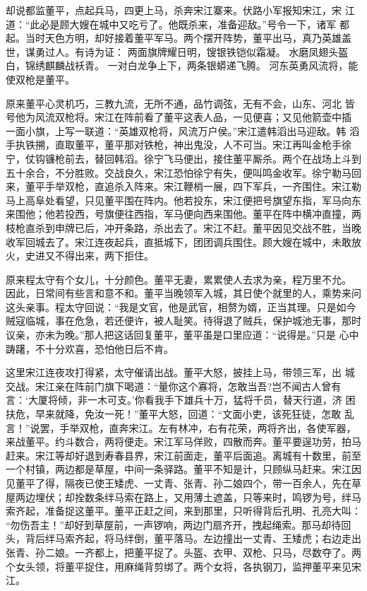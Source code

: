 却说都监董平，点起兵马，四更上马，杀奔宋江寨来。伏路小军报知宋江，宋
江道：“此必是顾大嫂在城中又吃亏了。他既杀来，准备迎敌。”号令一下，诸军
都起。当时天色方明，却好接着董平军马。两个摆开阵势，董平出马，真乃英雄盖
世，谋勇过人。有诗为证：
两面旗牌耀日明，锼银铁铠似霜凝。
水磨凤翅头盔白，锦绣麒麟战袄青。
一对白龙争上下，两条银蟒递飞腾。
河东英勇风流将，能使双枪是董平。

原来董平心灵机巧，三教九流，无所不通，品竹调弦，无有不会，山东、河北
皆号他为风流双枪将。宋江在阵前看了董平这表人品，一见便喜；又见他箭壶中插
一面小旗，上写一联道：“英雄双枪将，风流万户侯。”宋江遣韩滔出马迎敌。韩
滔手执铁搠，直取董平，董平那对铁枪，神出鬼没，人不可当。宋江再叫金枪手徐
宁，仗钩镰枪前去，替回韩滔。徐宁飞马便出，接住董平厮杀。两个在战场上斗到
五十余合，不分胜败。交战良久，宋江恐怕徐宁有失，便叫鸣金收军。徐宁勒马回
来，董平手举双枪，直追杀入阵来。宋江鞭梢一展，四下军兵，一齐围住。宋江勒
马上高阜处看望，只见董平围在阵内。他若投东，宋江便把号旗望东指，军马向东
来围他；他若投西，号旗便往西指，军马便向西来围他。董平在阵中横冲直撞，两
枝枪直杀到申牌已后，冲开条路，杀出去了。宋江不赶。董平因见交战不胜，当晚
收军回城去了。宋江连夜起兵，直抵城下，团团调兵围住。顾大嫂在城中，未敢放
火，史进又不得出来，两下拒住。

原来程太守有个女儿，十分颜色。董平无妻，累累使人去求为亲，程万里不允。
因此，日常间有些言和意不和。董平当晚领军入城，其日使个就里的人，乘势来问
这头亲事。程太守回说：“我是文官，他是武官，相赘为婿，正当其理。只是如今
贼寇临城，事在危急，若还便许，被人耻笑。待得退了贼兵，保护城池无事，那时
议亲，亦未为晚。”那人把这话回复董平，董平虽是口里应道：“说得是。”只是
心中踌躇，不十分欢喜，恐怕他日后不肯。

这里宋江连夜攻打得紧，太守催请出战。董平大怒，披挂上马，带领三军，出
城交战。宋江亲在阵前门旗下喝道：“量你这个寡将，怎敢当吾?岂不闻古人曾有
言：‘大厦将倾，非一木可支。’你看我手下雄兵十万，猛将千员，替天行道，济
困扶危，早来就降，免汝一死！”董平大怒，回道：“文面小吏，该死狂徒，怎敢
乱言！”说罢，手举双枪，直奔宋江。左有林冲，右有花荣，两将齐出，各使军器，
来战董平。约斗数合，两将便走。宋江军马佯败，四散而奔。董平要逞功劳，拍马
赶来。宋江等却好退到寿春县界，宋江前面走，董平后面追。离城有十数里，前至
一个村镇，两边都是草屋，中间一条驿路。董平不知是计，只顾纵马赶来。宋江因
见董平了得，隔夜已使王矮虎、一丈青、张青、孙二娘四个，带一百余人，先在草
屋两边埋伏；却拴数条绊马索在路上，又用薄土遮盖，只等来时，鸣锣为号，绊马
索齐起，准备捉这董平。董平正赶之间，来到那里，只听得背后孔明、孔亮大叫：
“勿伤吾主！”却好到草屋前，一声锣响，两边门扇齐开，拽起绳索。那马却待回
头，背后绊马索齐起，将马绊倒，董平落马。左边撞出一丈青、王矮虎；右边走出
张青、孙二娘。一齐都上，把董平捉了。头盔、衣甲、双枪、只马，尽数夺了。两
个女头领，将董平捉住，用麻绳背剪绑了。两个女将，各执钢刀，监押董平来见宋
江。

